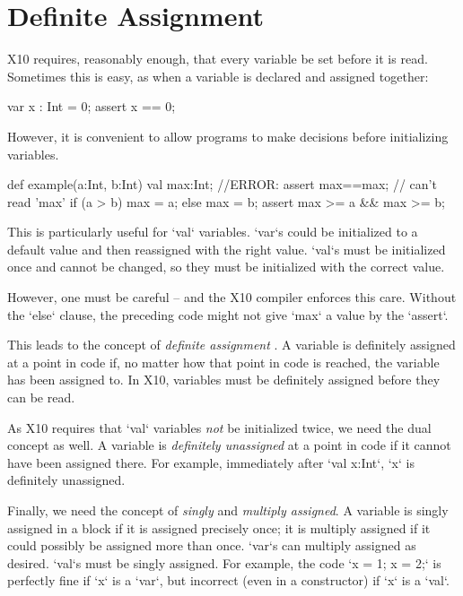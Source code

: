 \chapter{Definite Assignment}
\label{sect:DefiniteAssignment}

X10 requires, reasonably enough, that every variable be set before it is read.
Sometimes this is easy, as when a variable is declared and assigned together: 
\begin{xten}
  var x : Int = 0;
  assert x == 0;
\end{xten}
However, it is convenient to allow programs to make decisions before
initializing variables.
\begin{xten}
def example(a:Int, b:Int) {
  val max:Int;
  //ERROR: assert max==max; // can't read 'max'
  if (a > b) max = a;
  else max = b;
  assert max >= a && max >= b;
}
\end{xten}
This is particularly useful for \xcd`val` variables.  \xcd`var`s could be
initialized to a default value and then reassigned with the right value.
\xcd`val`s must be initialized once and cannot be changed, so they must be
initialized with the correct value. 

However, one must be careful -- and the X10 compiler enforces this care.
Without the \xcd`else` clause, the preceding code might not give \xcd`max` a
value by the \xcd`assert`.  

This leads to the concept of {\em definite assignment} \cite{jls2}.
A variable is definitely assigned at a point in code if, no matter how that
point in code is reached, the variable has been assigned to.  In X10,
variables must be definitely assigned before they can be read.


As X10 requires that \xcd`val` variables {\em not} be initialized
twice,  we need the dual concept as well.  A variable is {\em definitely
unassigned} at a point in code if it cannot have been assigned there.  For
example, immediately after \xcd`val x:Int`, \xcd`x` is definitely unassigned. 

Finally, we need the concept of {\em singly} and {\em multiply assigned}.
A variable is singly assigned in a block if it is assigned precisely
once; it is multiply assigned if it could possibly be assigned more than once.  
\xcd`var`s can  multiply assigned as desired. \xcd`val`s must be singly
assigned.  For example, the code \xcd`x = 1; x = 2;` is perfectly fine if
\xcd`x` is a \xcd`var`, but incorrect (even in a constructor) if \xcd`x` is a
\xcd`val`.  

